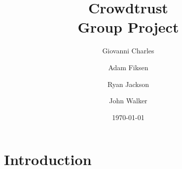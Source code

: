 \documentclass[11pt]{article}
\begin{document}
\title{Crowdtrust\\ Group Project }

\author{Giovanni Charles \and Adam Fiksen \and Ryan Jackson \and John Walker}

\date{\today}         %

\maketitle           %

\section{Introduction}
\end{document}
